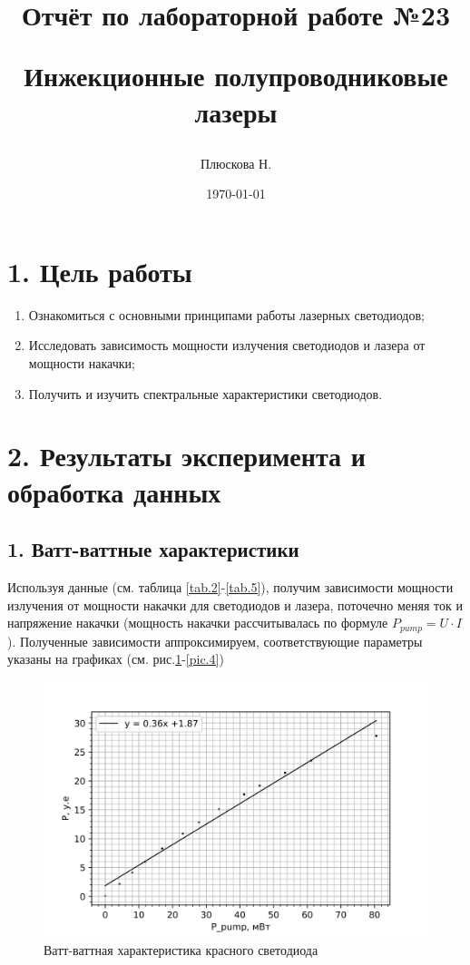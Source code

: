 \documentclass[a4paper,12pt]{report}
\title{Отчёт по лабораторной работе №23

Инжекционные полупроводниковые лазеры}
\author{Плюскова Н.}
\date{\today}
\begin{document}
\maketitle


\section*{1. Цель работы}
\begin{enumerate}
    \item Ознакомиться с основными принципами работы лазерных светодиодов;
    \item Исследовать зависимость мощности излучения светодиодов и лазера от мощности накачки;
    \item Получить и изучить спектральные характеристики светодиодов.
\end{enumerate}

\section*{2. Результаты эксперимента и обработка данных}
\subsection*{1. Ватт-ваттные характеристики}
 Используя данные (см. таблица \ref{tab.2}-\ref{tab.5}), получим зависимости мощности излучения от мощности накачки для светодиодов и лазера, поточечно меняя ток и напряжение накачки (мощность накачки рассчитывалась по формуле $P_{pump} = U\cdot I$). Полученные зависимости аппроксимируем, соответствующие параметры указаны на графиках (см. рис.\ref{pic.1}-\ref{pic.4})

\begin{figure}[H]
	\centering
	\includegraphics[scale=0.7]{Red_phdiod_1.png}
	\caption{Ватт-ваттная характеристика красного светодиода}
        \label{pic.1}
\end{figure}
\end{document}

